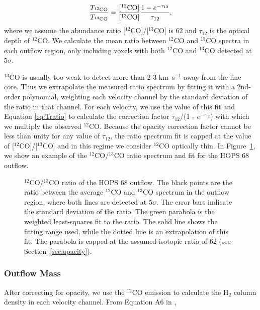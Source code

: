 \documentclass[twocolumn]{aastex63}
\newcommand{\example}{HOPS 68}
\newcommand{\kms}{km~s$^{-1}$}
\newcommand{\co}[1][]{\ensuremath{^{#1}}CO}
\begin{document}
\begin{equation}\label{eq:Tratio}
\frac{T_{\rm \co[12]}}{T_{\rm \co[13]}} = \frac{[\rm{\co[12]}]}{[\rm{\co[13]}]} \frac{1 - e^{-\tau_{12}}}{\tau_{12}},
\end{equation}
where we assume the abundance ratio [\co[12]]/[\co[13]] is 62 \citep{Langer93} and $\tau_{12}$ is the optical depth of \co[12]{}. We calculate the mean ratio between \co[12]{} and \co[13]{} spectra in each outflow region, only including voxels with both \co[12]{} and \co[13]{} detected at $5\sigma$. 

\co[13]{} is usually too weak to detect more than 2-3 \kms{} away from the line core. Thus we extrapolate the measured ratio spectrum by fitting it with a 2nd-order polynomial, weighting each velocity channel by the standard deviation of the ratio in that channel. For each velocity, we use the value of this fit and Equation \ref{eq:Tratio} to calculate the correction factor $\tau_{12}$/(1 - $e^{-\tau_{12}}$) with which we multiply the observed \co[12]{}. Because the opacity correction factor cannot be less than unity for any value of $\tau_{12}$, the ratio spectrum fit is capped at the value of [\co[12]]/[\co[13]] and in this regime we consider \co[12]{} optically thin. In Figure~\ref{fig:opacity}, we show an example of the \co[12]{}/\co[13]{} ratio spectrum and fit for the \example{} outflow. 

\begin{figure}
\caption{\co[12]{}/\co[13]{} ratio of the \example{} outflow. The black points are the ratio between the average \co[12]{} and \co[13]{} spectrum in the outflow region, where both lines are detected at $5\sigma$. The error bars indicate the standard deviation of the ratio. The green parabola is the weighted least-squares fit to the ratio. The solid line shows the fitting range used, while the dotted line is an extrapolation of this fit. The parabola is capped at the assumed isotopic ratio of 62 (see Section~\ref{sec:opacity}).\label{fig:opacity}}
\end{figure}

\subsubsection{Outflow Mass}\label{sec:dmdv}
After correcting for opacity, we use the \co[12]{} emission to calculate the H$_2$ column density in each velocity channel. From Equation A6 in \citet{ZhangY16},
\end{document}
